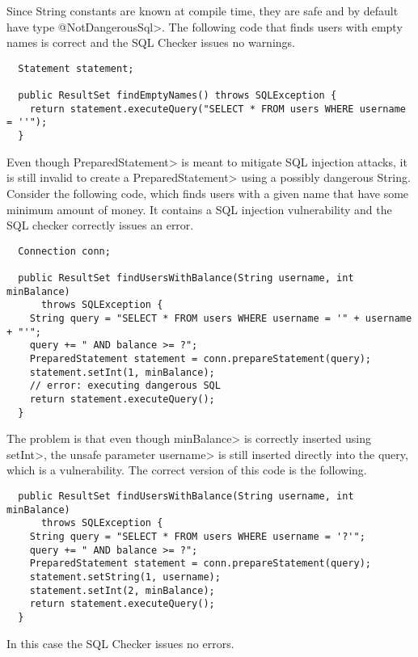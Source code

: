 Since String constants are known at compile time, they are safe and by default
have type \<@NotDangerousSql>. The following code that finds users with empty
names is correct and the SQL Checker issues no warnings.
\begin{Verbatim}
  Statement statement;

  public ResultSet findEmptyNames() throws SQLException {
    return statement.executeQuery("SELECT * FROM users WHERE username = ''");
  }
\end{Verbatim}

Even though \<PreparedStatement> is meant to mitigate SQL injection attacks, it
is still invalid to create a \<PreparedStatement> using a possibly dangerous
String. Consider the following code, which finds users with a given name that
have some minimum amount of money. It contains a SQL injection vulnerability and
the SQL checker correctly issues an error.
\begin{Verbatim}
  Connection conn;

  public ResultSet findUsersWithBalance(String username, int minBalance)
      throws SQLException {
    String query = "SELECT * FROM users WHERE username = '" + username + "'";
    query += " AND balance >= ?";
    PreparedStatement statement = conn.prepareStatement(query);
    statement.setInt(1, minBalance);
    // error: executing dangerous SQL
    return statement.executeQuery();
  }
\end{Verbatim}
The problem is that even though \<minBalance> is correctly inserted using
\<setInt>, the unsafe parameter \<username> is still inserted directly into the
query, which is a vulnerability. The correct version of this code is the
following.
\begin{Verbatim}
  public ResultSet findUsersWithBalance(String username, int minBalance)
      throws SQLException {
    String query = "SELECT * FROM users WHERE username = '?'";
    query += " AND balance >= ?";
    PreparedStatement statement = conn.prepareStatement(query);
    statement.setString(1, username);
    statement.setInt(2, minBalance);
    return statement.executeQuery();
  }
\end{Verbatim}
In this case the SQL Checker issues no errors.

